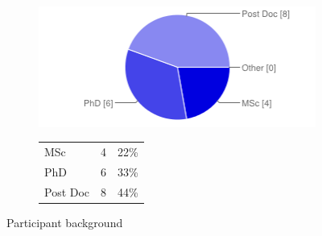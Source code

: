 \documentclass[MSc,paper=a4,pagesize=auto]{icldt}
\begin{document}
\begin{figure}[htbp!]
\centering
\begin{subfigure}{0.5\textwidth}
    \centering
    \includegraphics[width=1\linewidth]{resources/1-status}
\end{subfigure}%
\centering
\begin{subfigure}{0.5\textwidth}
    \centering
   	\begin{tabular}{ l c r }
   	MSc      & 4 & 22\% \\
  	PhD      & 6 & 33\% \\
	Post Doc	 & 8 & 44\% \\
\end{tabular}
\end{subfigure} 
    \caption{Participant background}
    \label{fig:1-status}
\end{figure}
\end{document}
